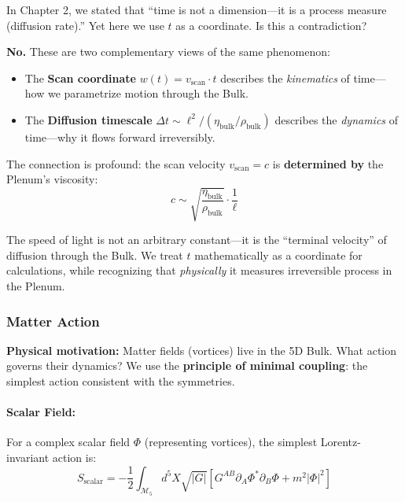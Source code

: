 \begin{tcolorbox}[colback=green!5,colframe=green!60!black,title=Reconciling ``Time as Dimension'' with ``Time as Process'']
In Chapter 2, we stated that ``time is not a dimension---it is a process measure (diffusion rate).'' Yet here we use $t$ as a coordinate. Is this a contradiction?

\textbf{No.} These are two complementary views of the same phenomenon:

\begin{itemize}
    \item The \textbf{Scan coordinate} $w(t) = v_{\text{scan}} \cdot t$ describes the \textit{kinematics} of time---how we parametrize motion through the Bulk.
    \item The \textbf{Diffusion timescale} $\Delta t \sim \ell^2/(\eta_{\text{bulk}}/\rho_{\text{bulk}})$ describes the \textit{dynamics} of time---why it flows forward irreversibly.
\end{itemize}

The connection is profound: the scan velocity $v_{\text{scan}} = c$ is \textbf{determined by} the Plenum's viscosity:
\begin{equation}
c \sim \sqrt{\frac{\eta_{\text{bulk}}}{\rho_{\text{bulk}}}} \cdot \frac{1}{\ell}
\end{equation}

The speed of light is not an arbitrary constant---it is the ``terminal velocity'' of diffusion through the Bulk. We treat $t$ mathematically as a coordinate for calculations, while recognizing that \textit{physically} it measures irreversible process in the Plenum.
\end{tcolorbox}

\subsubsection{Matter Action}

\textbf{Physical motivation:} Matter fields (vortices) live in the 5D Bulk. What action governs their dynamics? We use the \textbf{principle of minimal coupling}: the simplest action consistent with the symmetries.

\paragraph{Scalar Field:}

For a complex scalar field $\Phi$ (representing vortices), the simplest Lorentz-invariant action is:
\begin{equation}
S_{\text{scalar}} = -\frac{1}{2}\int_{\mathcal{M}_5} d^5X \sqrt{|G|} \left[ G^{AB}\partial_A\Phi^*\partial_B\Phi + m^2|\Phi|^2 \right]
\label{eq:scalar_action}
\end{equation}

